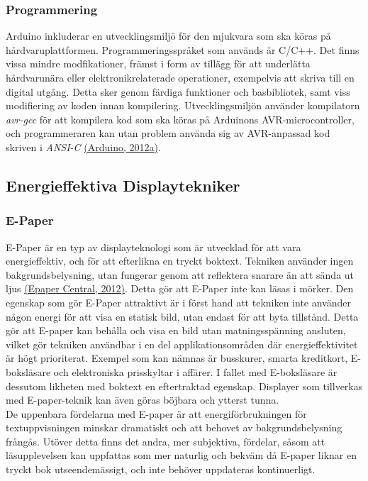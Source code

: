 \documentclass[a4paper,11pt]{article}
\begin{document}
\subsubsection{Programmering}	
Arduino inkluderar en utvecklingsmiljö för den mjukvara som ska köras på hårdvaruplattformen. Programmeringsspråket som används är C/C++. Det finns vissa mindre modfikationer, främst i form av tillägg för att underlätta hårdvarunära eller elektronikrelaterade operationer, exempelvis att skriva till en digital utgång. Detta sker genom färdiga funktioner och basbibliotek, samt viss modifiering av koden innan kompilering. Utvecklingsmiljön använder kompilatorn {\it avr-gcc} för att kompilera kod som ska köras på Arduinons AVR-microcontroller, och programmeraren kan utan problem använda sig av AVR-anpassad kod skriven i {\it ANSI-C} \hyperref[arduino]{(Arduino, 2012a)}.

\subsection{Energieffektiva Displaytekniker}

\subsubsection{E-Paper}
E-Paper är en typ av displayteknologi som är utvecklad för att vara energieffektiv, och för att efterlikna en tryckt boktext. Tekniken använder ingen bakgrundsbelysning, utan fungerar genom att reflektera snarare än att sända ut ljus \hyperref[epapercentral]{(Epaper Central, 2012)}. Detta gör att E-Paper inte kan läsas i mörker. Den egenskap som gör E-Paper attraktivt är i först hand att tekniken inte använder någon energi för att visa en statisk bild, utan endast för att byta tillstånd. Detta gör att E-paper kan behålla och visa en bild utan matningsspänning ansluten, vilket gör tekniken användbar i en del applikationsområden där energieffektivitet är högt prioriterat. Exempel som kan nämnas är busskurer, smarta kreditkort, E-boksläsare och elektroniska prisskyltar i affärer. I fallet med E-boksläsare är dessutom likheten med boktext en eftertraktad egenskap. Displayer som tillverkas med E-paper-teknik kan även göras böjbara och ytterst tunna. \\

De uppenbara fördelarna med E-paper är att energiförbrukningen för textuppvisningen minskar dramatiskt och att behovet av bakgrundsbelysning frångås. Utöver detta finns det andra, mer subjektiva, fördelar, såsom att läsupplevelsen kan uppfattas som mer naturlig och bekväm då E-paper liknar en tryckt bok utseendemässigt, och inte behöver uppdateras kontinuerligt. \\
\end{document}
